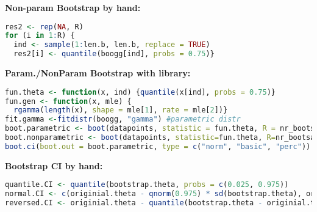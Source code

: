 \textbf{Non-param Bootstrap by hand:}
\begin{lstlisting}[language=R]
res2 <- rep(NA, R)
for (i in 1:R) {
  ind <- sample(1:len.b, len.b, replace = TRUE)
  res2[i] <- quantile(boogg[ind], probs = 0.75)}
\end{lstlisting}
\textbf{Param./NonParam Bootstrap with library:} 
\begin{lstlisting}[language=R]
fun.theta <- function(x, ind) {quantile(x[ind], probs = 0.75)}
fun.gen <- function(x, mle) {
  rgamma(length(x), shape = mle[1], rate = mle[2])}
fit.gamma <-fitdistr(boogg, "gamma") #parametric distr
boot.parametric <- boot(datapoints, statistic = fun.theta, R = nr_bootsamples, sim = "parametric", ran.gen = fun.gen, mle = fit.gamma$estimate) #parametric bootstrap
boot.nonparametric <- boot(datapoints, statistic=fun.theta, R=nr_bootsamples)#nonparam bootstrap
boot.ci(boot.out = boot.parametric, type = c("norm", "basic", "perc")) #all confidence intervals, norm = normal, basic = quantile, perc = reversed quantile
\end{lstlisting}
\textbf{Bootstrap CI by hand:}
\begin{lstlisting}[language=R]
quantile.CI <- quantile(bootstrap.theta, probs = c(0.025, 0.975))
normal.CI <- c(originial.theta - qnorm(0.975) * sd(bootstrap.theta), originial.theta + qnorm(0.975) * sd(bootstrap.theta))
reversed.CI <- originial.theta - quantile(bootstrap.theta - originial.theta, probs = c(0.975, 0.025))
\end{lstlisting}